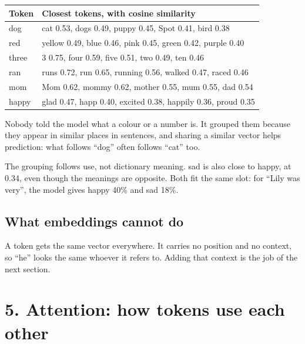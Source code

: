 \documentclass[11pt,a4paper]{article}
\newcommand{\vs}{\textvisiblespace}
\begin{document}
{\small
\begin{longtable}{@{}>{\raggedright\arraybackslash}p{}>{\raggedright\arraybackslash}p{}@{}}
\toprule
\textbf{Token} & \textbf{Closest tokens, with cosine similarity} \\
\midrule
\endhead
\vs{}dog & \vs{}cat 0.53, \vs{}dogs 0.49, \vs{}puppy 0.45, \vs{}Spot 0.41, \vs{}bird 0.38 \\
\vs{}red & \vs{}yellow 0.49, \vs{}blue 0.46, \vs{}pink 0.45, \vs{}green 0.42, \vs{}purple 0.40 \\
\vs{}three & \vs{}3 0.75, \vs{}four 0.59, \vs{}five 0.51, \vs{}two 0.49, \vs{}ten 0.46 \\
\vs{}ran & \vs{}runs 0.72, \vs{}run 0.65, \vs{}running 0.56, \vs{}walked 0.47, \vs{}raced 0.46 \\
\vs{}mom & \vs{}Mom 0.62, \vs{}mommy 0.62, \vs{}mother 0.55, \vs{}mum 0.55, \vs{}dad 0.54 \\
\vs{}happy & \vs{}glad 0.47, \vs{}happ 0.40, \vs{}excited 0.38, \vs{}happily 0.36, \vs{}proud 0.35 \\
\bottomrule
\end{longtable}
}

Nobody told the model what a colour or a number is. It grouped them because they appear in similar places in sentences, and sharing a similar vector helps prediction: what follows “dog” often follows “cat” too.

The grouping follows use, not dictionary meaning. \vs{}sad is also close to \vs{}happy, at 0.34, even though the meanings are opposite. Both fit the same slot: for “Lily was very”, the model gives \vs{}happy 40\% and \vs{}sad 18\%.

\subsection*{What embeddings cannot do}
{}

A token gets the same vector everywhere. It carries no position and no context, so “he” looks the same whoever it refers to. Adding that context is the job of the next section.

\section*{5. Attention: how tokens use each other}
{}
\end{document}
